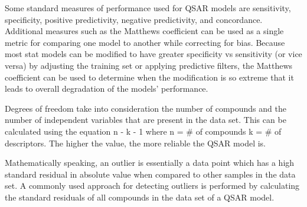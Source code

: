 Some standard measures of performance used for QSAR models are sensitivity, specificity, positive predictivity, negative predictivity, and concordance. Additional measures such as the Matthews coefficient can be used as a single metric for comparing one model to another while correcting for bias. Because most stat models can be modified to have greater specificity vs sensitivity (or vice versa) by adjusting the training set or applying predictive filters, the Matthews coefficient can be used to determine when the modification is so extreme that it leads to overall degradation of the models’ performance.\cite{Kruhlak2012}




Degrees of freedom take into consideration the number of compounds and the number of independent variables that are present in the data set. This can be calculated using the equation n - k - 1 where n = \# of compounds k = \# of descriptors. The higher the value, the more reliable the QSAR model is. \cite{Nantasenamat2009}

Mathematically speaking, an outlier is essentially a data point which has a high standard residual in absolute value when compared to other samples in the data set. A commonly used approach for detecting outliers is performed by calculating the standard residuals of all compounds in the data set of a QSAR model. \cite{Nantasenamat2009}

